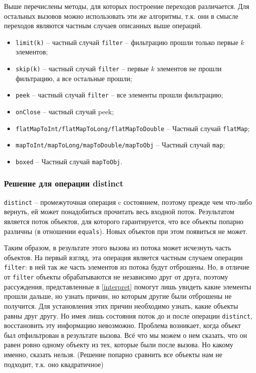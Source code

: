 Выше перечислены методы, для которых построение переходов различается. Для остальных вызовов можно использовать эти же алгоритмы, т.к. они в смысле переходов являются частным случаев описанных выше операций.
\begin{itemize}
	\item \texttt{limit(k)} -- частный случай \texttt{filter} -- фильтрацию прошли только первые $k$ элементов;
	\item \texttt{skip(k)} -- частный случай \texttt{filter} -- первые $k$ элементов не прошли фильтрацию, а все остальные прошли;
	\item \texttt{peek} -- частный случай \texttt{filter} -- все элементы прошли фильтрацию;
	\item \texttt{onClose} -- частный случай peek;
	\item \texttt{flatMapToInt/flatMapToLong/flatMapToDouble} -- Частный случай \texttt{flatMap};
	\item \texttt{mapToInt/mapToLong/mapToDouble/mapToObj} -- Частный случай \texttt{map};
	\item \texttt{boxed} -- Частный случай \texttt{mapToObj}.
\end{itemize}  


\subsubsection{Решение для операции distinct}\label{distinct}
\texttt{distinct} -- промежуточная операция c состоянием, поэтому прежде чем что-либо вернуть, ей может понадобиться прочитать весь входной поток. Результатом является поток объектов, для которого гарантируется, что все объекты попарно различны (в отношении \texttt{equals}\cite{java:equals}). Новых объектов при этом появиться не может.

Таким образом, в результате этого вызова из потока может исчезнуть часть объектов. На первый взгляд, эта операция является частным случаем операции \texttt{filter}: в ней так же часть элементов из потока будут отброшены. Но, в отличие от \texttt{filter} объекты обрабатываются не независимо друг от друга, поэтому рассуждения, представленные в \ref{interpret} помогут лишь увидеть какие элементы прошли дальше, но узнать причин, но которым другие были отброшены не получится. Для установления этих причин необходимо узнать, какие объекты равны друг другу. Но имея лишь состояния поток до и после операции \texttt{distinct}, восстановить эту информацию невозможно. Проблема возникает, когда объект был отфильтрован в результате вызова. Всё что мы можем о нем сказать, что он равен ровно одному объекту из тех, которые были после вызова. Но какому именно, сказать нельзя. (Решение попарно сравнить все объекты нам не подходит, т.к. оно квадратичное)

